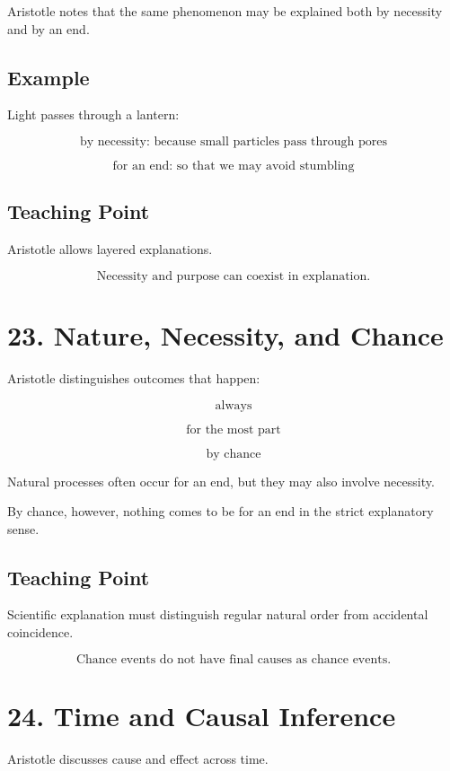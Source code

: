 \documentclass[12pt]{article}
\begin{document}
Aristotle notes that the same phenomenon may be explained both by necessity and
by an end.

\subsection*{Example}

Light passes through a lantern:

\[
\text{by necessity: because small particles pass through pores}
\]

\[
\text{for an end: so that we may avoid stumbling}
\]

\subsection*{Teaching Point}

Aristotle allows layered explanations.

\[
\boxed{
\text{Necessity and purpose can coexist in explanation.}
}
\]

\section*{23. Nature, Necessity, and Chance}

Aristotle distinguishes outcomes that happen:

\[
\text{always}
\]

\[
\text{for the most part}
\]

\[
\text{by chance}
\]

Natural processes often occur for an end, but they may also involve necessity.

By chance, however, nothing comes to be for an end in the strict explanatory
sense.

\subsection*{Teaching Point}

Scientific explanation must distinguish regular natural order from accidental
coincidence.

\[
\boxed{
\text{Chance events do not have final causes as chance events.}
}
\]

\section*{24. Time and Causal Inference}

Aristotle discusses cause and effect across time.
\end{document}
